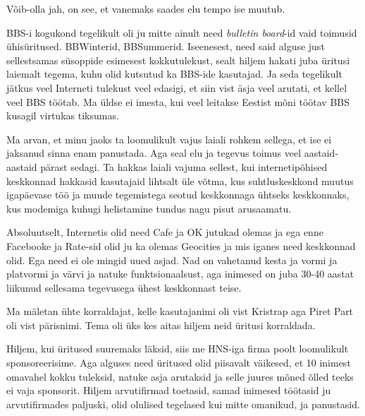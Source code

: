 
Võib-olla jah, on see, et vanemaks saades elu tempo ise muutub.


BBS-i kogukond tegelikult oli ju mitte ainult need \emph{bulletin board}-id vaid toimusid ühisüritused. BBWinterid, BBSummerid. Iseenesest, need said alguse just sellestsamas süsoppide esimesest kokkutulekust, sealt hiljem hakati juba üritusi laiemalt tegema, kuhu olid kutsutud ka BBS-ide kasutajad. Ja seda tegelikult jätkus veel Interneti tulekust veel edasigi, et siin vist äsja veel arutati, et kellel veel BBS töötab. Ma üldse ei imesta, kui veel leitakse Eestist mõni töötav BBS kusagil virtukas tiksumas. 

Ma arvan, et minu jaoks ta loomulikult vajus laiali rohkem sellega, et ise ei jaksanud sinna enam panustada. Aga seal elu ja tegevus toimus veel aastaid-aastaid pärast sedagi. Ta hakkas  laiali vajuma sellest, kui internetipõhised keskkonnad hakkasid  kasutajaid lihtsalt üle võtma, kus suhtluskeskkond muutus  igapäevase töö  ja muude tegemistega seotud keskkonnaga ühtseks keskkonnaks, kus modemiga kuhugi helistamine tundus nagu pisut arusaamatu.


Absoluutselt, Internetis olid need Cafe ja OK jutukad  olemas ja ega enne Facebooke ja Rate-sid olid ju ka olemas Geocities ja mis iganes need keskkonnad olid. Ega need ei ole mingid uued asjad. Nad on vahetanud kesta ja vormi ja platvormi ja värvi ja natuke funktsionaalsust, aga inimesed on juba 30-40 aastat liikunud sellesama tegevusega  ühest keskkonnast teise.
                 

Ma mäletan ühte korraldajat, kelle kasutajanimi oli vist Kristrap aga Piret Part oli vist pärisnimi. Tema oli üks kes aitas hiljem neid üritusi korraldada.


Hiljem, kui üritused suuremaks läksid, siis me HNS-iga firma poolt loomulikult sponsoreerisime. Aga alguses need üritused olid piisavalt väikesed, et 10 inimest omavahel kokku tuleksid, natuke asja arutaksid ja selle juures mõned õlled teeks ei vaja sponsorit. Hiljem  arvutifirmad toetasid, samad inimesed töötasid ju arvutifirmades paljuski, olid olulised tegelased kui mitte omanikud, ja panustasid.
                 
